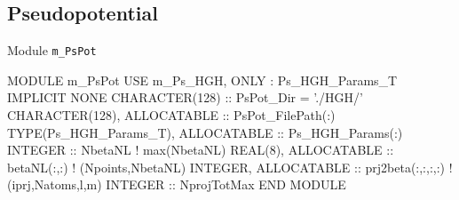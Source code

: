 \subsection{Pseudopotential}

Module {\tt m\_PsPot}

\begin{fortrancode}
MODULE m_PsPot
  USE m_Ps_HGH, ONLY : Ps_HGH_Params_T
  IMPLICIT NONE 
  CHARACTER(128) :: PsPot_Dir = './HGH/'
  CHARACTER(128), ALLOCATABLE :: PsPot_FilePath(:)
  TYPE(Ps_HGH_Params_T), ALLOCATABLE :: Ps_HGH_Params(:)
  INTEGER :: NbetaNL  ! max(NbetaNL)
  REAL(8), ALLOCATABLE :: betaNL(:,:) ! (Npoints,NbetaNL)
  INTEGER, ALLOCATABLE :: prj2beta(:,:,:,:) ! (iprj,Natoms,l,m)
  INTEGER :: NprojTotMax
END MODULE 
\end{fortrancode}





